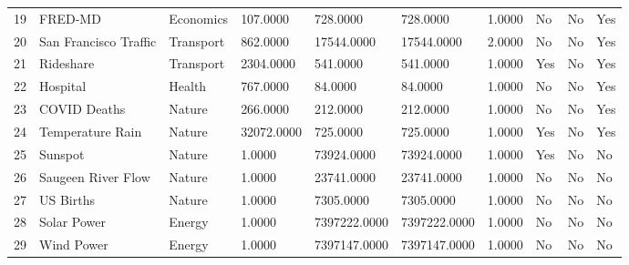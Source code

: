 \begin{tabular}{llllllllll}
19 & FRED-MD & Economics & 107.0000 & 728.0000 & 728.0000 & 1.0000 & No & No & Yes \\
20 & San Francisco Traffic & Transport & 862.0000 & 17544.0000 & 17544.0000 & 2.0000 & No & No & Yes \\
21 & Rideshare & Transport & 2304.0000 & 541.0000 & 541.0000 & 1.0000 & Yes & No & Yes \\
22 & Hospital & Health & 767.0000 & 84.0000 & 84.0000 & 1.0000 & No & No & Yes \\
23 & COVID Deaths & Nature & 266.0000 & 212.0000 & 212.0000 & 1.0000 & No & No & Yes \\
24 & Temperature Rain & Nature & 32072.0000 & 725.0000 & 725.0000 & 1.0000 & Yes & No & Yes \\
25 & Sunspot & Nature & 1.0000 & 73924.0000 & 73924.0000 & 1.0000 & Yes & No & No \\
26 & Saugeen River Flow & Nature & 1.0000 & 23741.0000 & 23741.0000 & 1.0000 & No & No & No \\
27 & US Births & Nature & 1.0000 & 7305.0000 & 7305.0000 & 1.0000 & No & No & No \\
28 & Solar Power & Energy & 1.0000 & 7397222.0000 & 7397222.0000 & 1.0000 & No & No & No \\
29 & Wind Power & Energy & 1.0000 & 7397147.0000 & 7397147.0000 & 1.0000 & No & No & No \\
\bottomrule
\end{tabular}
